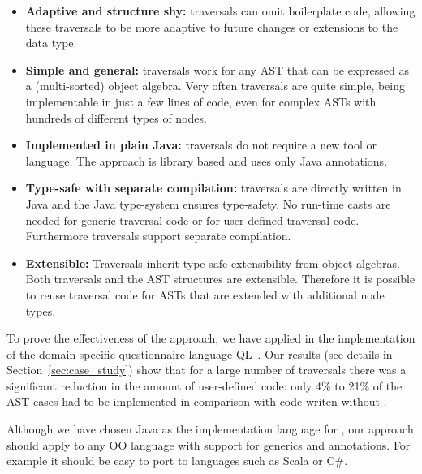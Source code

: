 \begin{itemize}

\item {\bf Adaptive and structure shy:} \name traversals can omit
  boilerplate code, allowing these traversals to be more adaptive to
  future changes or extensions to the data type.

\item {\bf Simple and general:} \name traversals work for any
  AST that can be expressed as a (multi-sorted) object
  algebra. Very often traversals are quite simple, being
  implementable in just a few lines of code, even for complex
  ASTs with hundreds of different types of nodes.

\item {\bf Implemented in plain Java:} \name traversals do not require
  a new tool or language. The approach is library based and uses only
  Java annotations.

\item {\bf Type-safe with separate compilation:} \name traversals are directly written in Java
  and the Java type-system ensures type-safety. No run-time casts are
  needed for generic traversal code or for user-defined traversal
  code. Furthermore \name traversals support separate compilation.

\item {\bf Extensible:} Traversals inherit type-safe
  extensibility from object algebras. Both traversals and the AST structures
  are extensible. Therefore it is possible to
  reuse traversal code for ASTs that are extended with additional
  node types.


\end{itemize}

To prove the effectiveness of the approach, we have applied \name in
the implementation of the domain-specific questionnaire language
QL~\cite{gouseti14extensible}.  Our results (see details in
Section~\ref{sec:case_study}) show that for a large number of traversals there was a
significant reduction in the amount of user-defined code: only 4\% to
21\% of the AST cases had to be implemented in comparison with code
writen without \name.

Although we have chosen Java as the implementation language for \Name,
our approach should apply to any OO language with support for generics
and annotations. For example it should be easy to port \name to
languages such as Scala or C\#.


